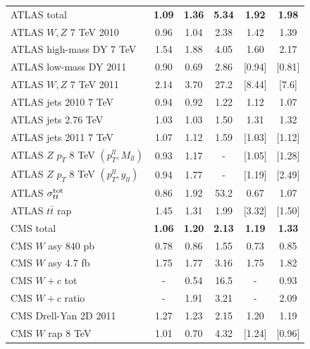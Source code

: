 \begin{table}[h]
\begin{center}
\begin{tabular}{|l|c|c|c||c|c|}
\hline
\hline
ATLAS total   &    {\bf 1.09}      &   {\bf 1.36}   &    {\bf 5.34}         &   {\bf 1.92 }  & {\bf 1.98}  \\    
ATLAS $W,Z$ 7 TeV 2010    &    0.96     &   1.04   &    2.38         &   1.42   &   1.39  \\    
ATLAS high-mass DY 7 TeV    &    1.54     &   1.88   &   4.05         &   1.60   &   2.17  \\    
ATLAS low-mass DY 2011    &    0.90      &   0.69   &   2.86         &   [0.94]   &   [0.81]  \\    
ATLAS $W,Z$ 7 TeV 2011    &    2.14     &   3.70   &    27.2       &   [8.44]   &   [7.6]  \\    
ATLAS jets 2010 7 TeV     &    0.94      &   0.92   &  1.22        &   1.12   &   1.07  \\    
ATLAS jets 2.76 TeV     &    1.03      &   1.03   &     1.50     &   1.31   &   1.32  \\    
ATLAS jets 2011 7 TeV     &    1.07     &   1.12   &   1.59       &   [1.03]   &   [1.12]  \\    
ATLAS $Z$ $p_T$ 8 TeV $(p_T^{ll},M_{ll})$       &    0.93    &   1.17   &   -         &   [1.05]  &  [1.28]  \\    
ATLAS $Z$ $p_T$ 8 TeV $(p_T^{ll},y_{ll})$    &    0.94      &   1.77   &   -         &   [1.19]   &   [2.49]  \\    
ATLAS $\sigma_{tt}^{\rm tot}$     &    0.86      &   1.92   &  53.2           &   0.67   &   1.07  \\    
ATLAS $t\bar{t}$ rap    &    1.45     &   1.31   &  1.99       &   [3.32]   &   [1.50]  \\
\hline
CMS total   &   {\bf  1.06}    &   {\bf 1.20 }  &    {\bf 2.13}        &   {\bf 1.19 }  &
{\bf 1.33}  \\    
CMS $W$ asy 840 pb     &    0.78     &   0.86   &    1.55       &   0.73   &   0.85  \\    
CMS $W$ asy 4.7 fb     &    1.75     &   1.77   &   3.16      &   1.75   &   1.82  \\    
CMS $W+c$ tot    &    -     &   0.54   &    16.5          &   -   &   0.93  \\    
CMS $W+c$ ratio    &    -      &   1.91   &    3.21         &   -   &   2.09  \\    
CMS Drell-Yan 2D 2011    &    1.27     &   1.23   &  2.15           &   1.20   &   1.19  \\    
CMS $W$ rap 8 TeV    &    1.01      &   0.70   &    4.32         &   [1.24]   &   [0.96]  \\    

\end{tabular}
\end{center}
\end{table}
